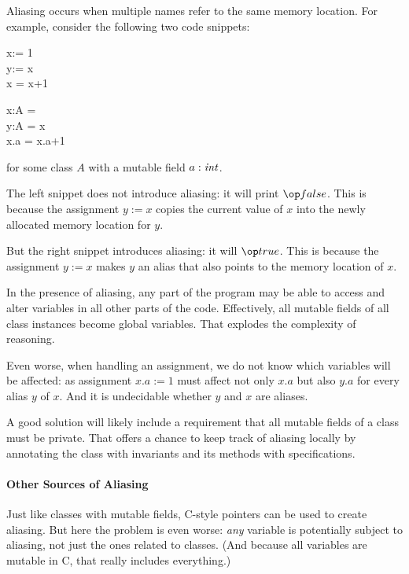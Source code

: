Aliasing occurs when multiple names refer to the same memory location.
For example, consider the following two code snippets:

\begin{multicols}{2}
\begin{acode}
x:\Int = 1\\
y:\Int = x\\
x = x+1\\
\end{acode}
\columnbreak

\begin{acode}
x:A = \\
y:A = x\\
x.a = x.a+1\\
\end{acode}
\end{multicols}
for some class $A$ with a mutable field $a:\mathit{int}$.

The left snippet does not introduce aliasing: it will print $\false$.
This is because the assignment $y:=x$ copies the current value of $x$ into the newly allocated memory location for $y$.

But the right snippet introduces aliasing: it will $\true$.
This is because the assignment $y:=x$ makes $y$ an alias that also points to the memory location of $x$.

In the presence of aliasing, any part of the program may be able to access and alter variables in all other parts of the code.
Effectively, all mutable fields of all class instances become global variables.
That explodes the complexity of reasoning.

Even worse, when handling an assignment, we do not know which variables will be affected: as assignment $x.a:=1$ must affect not only $x.a$ but also $y.a$ for every alias $y$ of $x$.
And it is undecidable whether $y$ and $x$ are aliases.

A good solution will likely include a requirement that all mutable fields of a class must be private.
That offers a chance to keep track of aliasing locally by annotating the class with invariants and its methods with specifications.

\paragraph{Other Sources of Aliasing}
Just like classes with mutable fields, C-style pointers can be used to create aliasing.
But here the problem is even worse: \emph{any} variable is potentially subject to aliasing, not just the ones related to classes.
(And because all variables are mutable in C, that really includes everything.)

